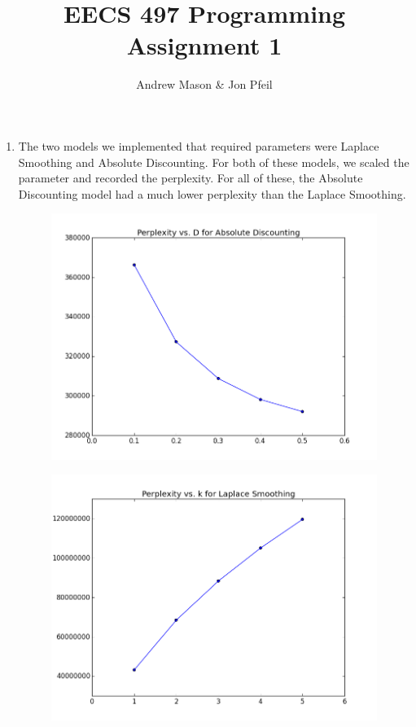 \documentclass[12pt]{article}
\author{Andrew Mason \& Jon Pfeil}
\title{EECS 497 Programming Assignment 1}
\begin{document}
\maketitle

\begin{enumerate}
  \item
    The two models we implemented that required parameters were Laplace Smoothing
    and Absolute Discounting. For both of these models, we scaled the parameter and
    recorded the perplexity. For all of these, the Absolute Discounting model had
    a much lower perplexity than the Laplace Smoothing.\\
    \begin{figure}[H]
      \includegraphics[width=\linewidth]{perplexity_vs_d.png}
    \end{figure}
    \begin{figure}[H]
      \includegraphics[width=\linewidth]{perplexity_vs_k.png}

\end{figure}
\end{enumerate}
\end{document}
